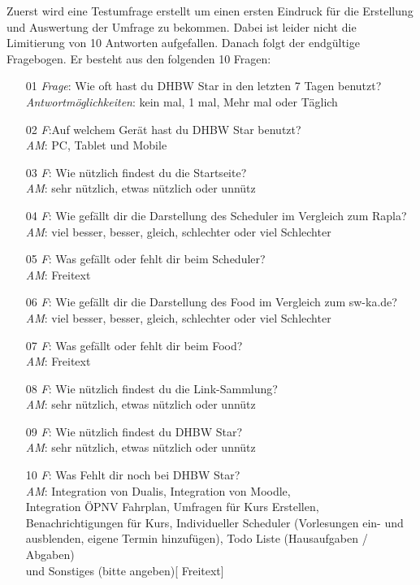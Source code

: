 Zuerst wird eine Testumfrage erstellt um einen ersten Eindruck für die Erstellung und Auswertung der Umfrage zu bekommen. Dabei ist leider nicht die Limitierung von 10 Antworten aufgefallen.
Danach folgt der endgültige Fragebogen. Er besteht aus den folgenden 10 Fragen:
\begin{itemize}
	\item[01] {\emph{Frage}: Wie oft hast du DHBW Star in den letzten 7 Tagen benutzt?\\
		\emph{Antwortmöglichkeiten}: kein mal, 1 mal, Mehr mal oder Täglich}
	\item[02]{\emph{F}:Auf welchem Gerät hast du DHBW Star benutzt?\\
		\emph{AM}: PC, Tablet und Mobile}
	\item[03]{\emph{F}: Wie nützlich findest du die Startseite?\\
		\emph{AM}: sehr nützlich, etwas nützlich oder unnütz}
	\item[04]{\emph{F}: Wie gefällt dir die Darstellung des Scheduler im Vergleich zum Rapla?\\
		\emph{AM}: viel besser, besser, gleich, schlechter oder viel Schlechter}
	\item[05]{\emph{F}: Was gefällt oder fehlt dir beim Scheduler?\\
		\emph{AM}: Freitext}
	\item[06]{\emph{F}: Wie gefällt dir die Darstellung des Food im Vergleich zum sw-ka.de?\\
		\emph{AM}: viel besser, besser, gleich, schlechter oder viel Schlechter}
	\item[07]{\emph{F}: Was gefällt oder fehlt dir beim Food?\\
		\emph{AM}: Freitext}
	\item[08]{\emph{F}: Wie nützlich findest du die Link-Sammlung?\\
		\emph{AM}: sehr nützlich, etwas nützlich oder unnütz}
	\item[09]{\emph{F}: Wie nützlich findest du DHBW Star?\\
		\emph{AM}: sehr nützlich, etwas nützlich oder unnütz}
	\item[10]{\emph{F}: Was Fehlt dir noch bei DHBW Star?\\
		\emph{AM}: Integration von Dualis, Integration von Moodle,\\ Integration ÖPNV Fahrplan, Umfragen für Kurs Erstellen,\\ Benachrichtigungen für Kurs, Individueller Scheduler (Vorlesungen ein- und ausblenden, eigene Termin hinzufügen), Todo Liste (Hausaufgaben / Abgaben)\\ und Sonstiges (bitte angeben)[ Freitext]}
\end{itemize}
